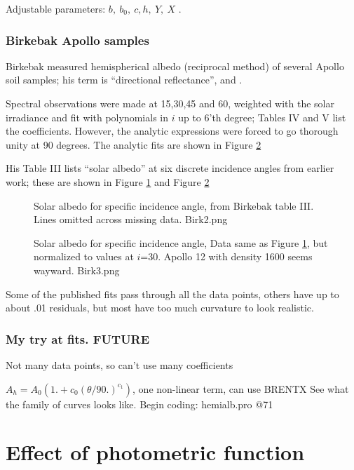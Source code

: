 \documentclass{article}
\begin{document}
Adjustable parameters: $b, \ b_0, \ c, h, \ Y, \ X$ . 


\subsubsection{Birkebak Apollo samples}

Birkebak measured hemispherical albedo (reciprocal method) of several Apollo
soil samples; his term is ``directional reflectance'',  and
 .

Spectral observations were made at 15,30,45 and 60\qd, weighted with the solar
irradiance and fit with polynomials in $i$ up to 6'th degree; 
Tables IV and V list the coefficients.  However, the analytic expressions were
forced to go thorough unity at 90 degrees.  The analytic fits are shown in
Figure \ref{Birk3}

His Table III lists ``solar albedo'' at six discrete incidence angles from
earlier work; these are shown in Figure \ref{Birk2} and Figure \ref{Birk3}

\begin{figure}[!ht] 
\caption[Lunar albedo]{Solar albedo for specific incidence angle, from Birkebak table III. Lines omitted across missing data.
\label{Birk2} Birk2.png  }
\end{figure} 
\begin{figure}[!ht] 
\caption[Lunar albedo, normalized]{Solar albedo for specific incidence angle,
  Data same as Figure \ref{Birk2}, but normalized to values at $i$=30\qd. Apollo
  12 with density 1600 seems wayward.
\label{Birk3} Birk3.png }
\end{figure} 

 Some of the published fits pass through all the data points, others have up to
 about .01 residuals, but most have too much curvature to look realistic.


\subsubsection{My try at fits. FUTURE} %

Not many data points, so can't use many coefficients

$A_h=A_0(1.+ c_0 (\theta/90.) ^{c_1}) $, one non-linear term, can use BRENTX
See what the family of curves looks like.
Begin coding: hemialb.pro @71

\section{Effect of photometric function}
\end{document}
